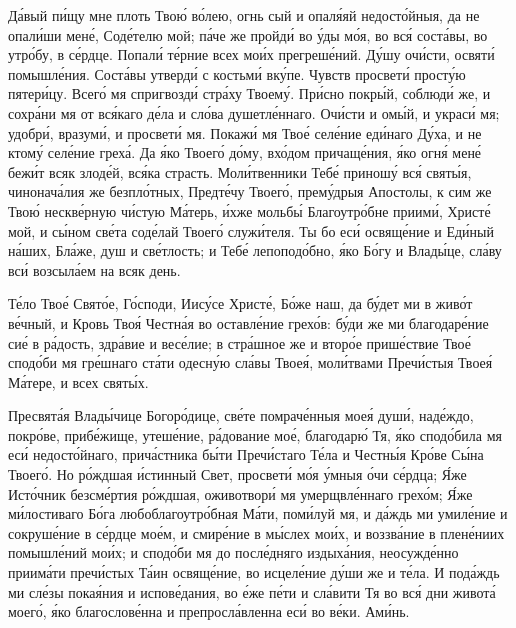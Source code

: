 \begin{mymulticols}

Д\'{а}вый п\'{и}щу мне плоть Тво\'{ю} в\'{о}лею, огнь сый и опал\'{я}яй недост\'{о}йныя, да не опал\'{и}ши мен\'{е}, Сод\'{е}телю мой; п\'{а}че же пройд\'{и} во \'{у}ды м\'{о}я, во вс\'{я} сост\'{а}вы, во утр\'{о}бу, в с\'{е}рдце. Попал\'{и} т\'{е}рние всех мо\'{и}х прегреш\'{е}ний. Д\'{у}шу оч\'{и}сти, освят\'{и} помышл\'{е}ния. Сост\'{а}вы утверд\'{и} с костьм\'{и} вк\'{у}пе. Чувств просвет\'{и} прост\'{у}ю пятер\'{и}цу. Всег\'{о} мя спригвозд\'{и} стр\'{а}ху Твоем\'{у}. Пр\'{и}сно покр\'{ы}й, соблюд\'{и} же, и сохр\'{а}ни мя от вс\'{я}каго д\'{е}ла и сл\'{о}ва душетл\'{е}ннаго. Оч\'{и}сти и ом\'{ы}й, и украс\'{и} мя; удобр\'{и}, вразум\'{и}, и просвет\'{и} мя. Покаж\'{и} мя Тво\'{е} сел\'{е}ние ед\'{и}наго Д\'{у}ха, и не ктом\'{у} сел\'{е}ние грех\'{а}. Да \'{я}ко Твоег\'{о} д\'{о}му, вх\'{о}дом причащ\'{е}ния, \'{я}ко огн\'{я} мен\'{е} беж\'{и}т всяк злод\'{е}й, вс\'{я}ка страсть. Мол\'{и}твенники Теб\'{е} принош\'{у} вс\'{я} свят\'{ы}я, чинонач\'{а}лия же безпл\'{о}тных, Предт\'{е}чу Твоег\'{о}, прем\'{у}дрыя Апостолы, к сим же Тво\'{ю} нескв\'{е}рную ч\'{и}стую М\'{а}терь, \'{и}хже мольб\'{ы} Благоутр\'{о}бне приим\'{и}, Христ\'{е} мой, и с\'{ы}ном св\'{е}та сод\'{е}лай Твоег\'{о} служ\'{и}теля. Ты бо ес\'{и} освящ\'{е}ние и Ед\'{и}ный н\'{а}ших, Бл\'{а}же, душ и св\'{е}тлость; и Теб\'{е} лепопод\'{о}бно, \'{я}ко Б\'{о}гу и Влад\'{ы}це, сл\'{а}ву вс\'{и} возсыл\'{а}ем на всяк день.


Т\'{е}ло Тво\'{е} Свят\'{о}е, Г\'{о}споди, Иис\'{у}се Христ\'{е}, Б\'{о}же наш, да б\'{у}дет ми в жив\'{о}т в\'{е}чный, и Кровь Тво\'{я} Честн\'{а}я во оставл\'{е}ние грех\'{о}в: б\'{у}ди же ми благодар\'{е}ние си\'{е} в р\'{а}дость, здр\'{а}вие и вес\'{е}лие; в стр\'{а}шное же и втор\'{о}е приш\'{е}ствие Тво\'{е} спод\'{о}би мя гр\'{е}шнаго ст\'{а}ти одесн\'{у}ю сл\'{а}вы Твое\'{я}, мол\'{и}твами Преч\'{и}стыя Твое\'{я} М\'{а}тере, и всех свят\'{ы}х.


Пресвят\'{а}я Влад\'{ы}чице Богор\'{о}дице, св\'{е}те помрач\'{е}нныя мое\'{я} душ\'{и}, над\'{е}ждо, покр\'{о}ве, приб\'{е}жище, утеш\'{е}ние, р\'{а}дование мо\'{е}, благодар\'{ю} Тя, \'{я}ко спод\'{о}била мя ес\'{и} недост\'{о}йнаго, прич\'{а}стника б\'{ы}ти Преч\'{и}стаго Т\'{е}ла и Честн\'{ы}я Кр\'{о}ве С\'{ы}на Твоег\'{о}. Но р\'{о}ждшая \'{и}стинный Свет, просвет\'{и} м\'{о}я \'{у}мныя \'{о}чи с\'{е}рдца; \'{Я}же Ист\'{о}чник безсм\'{е}ртия р\'{о}ждшая, оживотвор\'{и} мя умерщвл\'{е}ннаго грех\'{о}м; \'{Я}же м\'{и}лостиваго Б\'{о}га любоблагоутр\'{о}бная М\'{а}ти, пом\'{и}луй мя, и д\'{а}ждь ми умил\'{е}ние и сокруш\'{е}ние в с\'{е}рдце мо\'{е}м, и смир\'{е}ние в м\'{ы}слех мо\'{и}х, и воззв\'{а}ние в плен\'{е}ниих помышл\'{е}ний мо\'{и}х; и спод\'{о}би мя до посл\'{е}дняго издых\'{а}ния, неосужд\'{е}нно приим\'{а}ти преч\'{и}стых Т\'{а}ин освящ\'{е}ние, во исцел\'{е}ние д\'{у}ши же и т\'{е}ла. И под\'{а}ждь ми сл\'{е}зы пока\'{я}ния и испов\'{е}дания, во \'{е}же п\'{е}ти и сл\'{а}вити Тя во вс\'{я} дни живот\'{а} моег\'{о}, \'{я}ко благослов\'{е}нна и препросл\'{а}вленна ес\'{и} во в\'{е}ки. Ам\'{и}нь.


\end{mymulticols}
